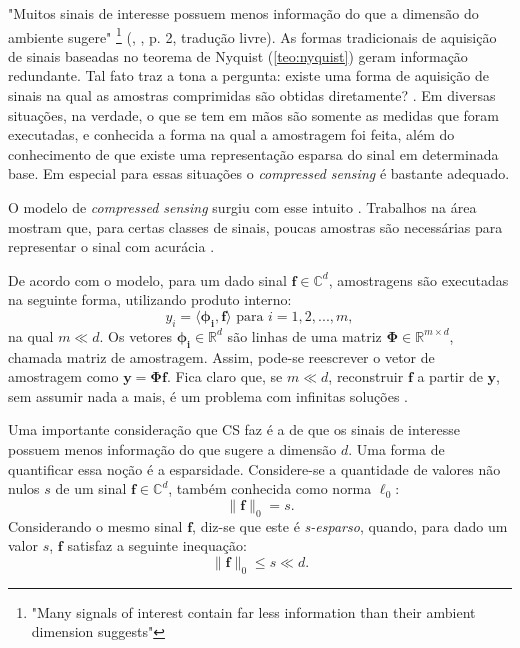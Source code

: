 \documentclass[cic,tc]{iiufrgs}
\renewcommand{\vec}[1]{\bm{#1}}
\begin{document}
"Muitos sinais de interesse possuem menos informação do que a dimensão do ambiente sugere"
\footnote{"Many signals of interest contain far less information than their ambient dimension suggests"}
(\citeauthor{chen2015compressed}, \citeyear{chen2015compressed}, p. 2, tradução livre).
As formas tradicionais de aquisição de sinais baseadas no teorema de Nyquist (\ref{teo:nyquist}) 
geram informação redundante.
Tal fato traz a tona a pergunta: existe 
uma forma de aquisição de sinais na qual as amostras comprimidas são obtidas diretamente? \cite{chen2015compressed}.
Em diversas situações, na verdade, o que se tem em mãos são somente as medidas que foram executadas, 
e conhecida a forma na qual a amostragem foi feita, além do conhecimento de que existe uma representação
esparsa do sinal em determinada base.
Em especial para essas situações o \emph{compressed sensing} é bastante adequado.

O modelo de \emph{compressed sensing} surgiu com esse intuito \cite{DonohoCS}. Trabalhos na área mostram que, para certas classes
de sinais, poucas amostras são necessárias para representar o sinal com acurácia \cite{chen2015compressed}.

De acordo com o modelo, para um dado sinal $ \vec{f} \in \mathbb{C}^d $, 
amostragens são executadas na seguinte forma, utilizando produto interno:
\begin{equation}
    y_i = \langle \vec{\phi_i}, \vec{f} \rangle \text{ para } i=1,2,...,m, 
\end{equation}
na qual $m \ll d$. Os vetores $\vec{\phi_i} \in \mathbb{R}^d$ são linhas de uma matriz $\mathbf{\Phi} \in \mathbb{R}^{m \times d}$, chamada matriz 
de amostragem. Assim, pode-se reescrever o vetor de amostragem como $\vec{y} = \mathbf{\Phi} \vec{f}$. Fica claro que, 
se $ m \ll d$, reconstruir $\vec{f}$ a partir de $\vec{y}$, sem assumir nada a mais, é um problema 
com infinitas soluções \cite{chen2015compressed}.

Uma importante consideração que CS faz é a de que os sinais de interesse possuem menos informação do que sugere a 
dimensão $d$. 
Uma forma de quantificar essa noção é a esparsidade.
Considere-se a quantidade de valores não
nulos $s$ de um sinal $\vec{f} \in \mathbb{C}^d$, também conhecida como norma $\ell_0$:
\begin{equation}
    \lVert \vec{f} \rVert_0 = s.
\end{equation}
Considerando o mesmo sinal $\vec{f}$, diz-se que este é \textit{s-esparso}, quando, para dado um valor $s$, $\vec{f}$
satisfaz a seguinte inequação:
\begin{equation}
    \label{eq:f0less}
    \lVert \vec{f} \rVert_0 \le s \ll d.
\end{equation} 
\end{document}

